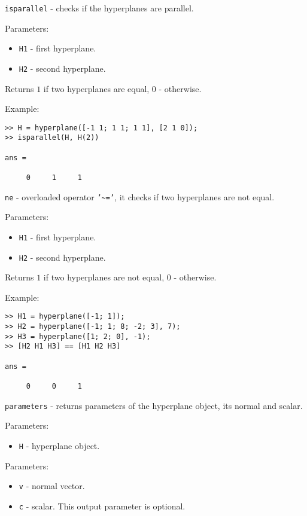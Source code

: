 \newpage

{\Large {\tt isparallel}} - checks if the hyperplanes are parallel.

Parameters:
\begin{itemize}
\item {\tt H1} - first hyperplane.
\item {\tt H2} - second hyperplane.
\end{itemize}

Returns $1$ if two hyperplanes are equal, $0$ - otherwise.

Example:
{\tt \begin{verbatim}
>> H = hyperplane([-1 1; 1 1; 1 1], [2 1 0]);
>> isparallel(H, H(2))

ans =

     0     1     1
\end{verbatim} }

\newpage

{\Large {\tt ne}} - overloaded operator {\tt '\~{ }='},
it checks if two hyperplanes are not equal.

Parameters:
\begin{itemize}
\item {\tt H1} - first hyperplane.
\item {\tt H2} - second hyperplane.
\end{itemize}

Returns $1$ if two hyperplanes are not equal, $0$ - otherwise.

Example:
{\tt \begin{verbatim}
>> H1 = hyperplane([-1; 1]);
>> H2 = hyperplane([-1; 1; 8; -2; 3], 7);
>> H3 = hyperplane([1; 2; 0], -1);
>> [H2 H1 H3] == [H1 H2 H3]

ans =

     0     0     1
\end{verbatim} }

\newpage

{\Large {\tt parameters}} - returns parameters of the hyperplane object,
its normal and scalar.

Parameters:
\begin{itemize}
\item {\tt H} - hyperplane object.
\end{itemize}

Parameters:
\begin{itemize}
\item {\tt v} - normal vector.
\item {\tt c} - scalar. This output parameter is optional.
\end{itemize}

